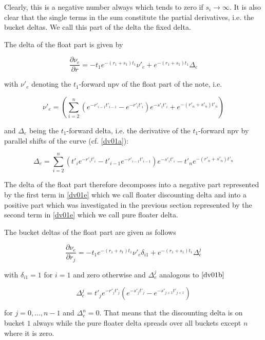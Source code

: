 \documentclass{amsart}
\theoremstyle{plain}
\numberwithin{equation}{section}
\begin{document}
Clearly, this is a negative number always which tends to zero if $s_i\rightarrow\infty$. It is also clear that the single terms in the sum constitute the
partial derivatives, i.e. the bucket deltas. We call this part of the delta the fixed delta.

The delta of the float part is given by

\begin{equation}\label{dv01e}
\frac{\partial \nu_e}{\partial r} = -t_1 e^{-(r_1+s_1)t_1} \nu'_e +  e^{-(r_1+s_1) t_1} \Delta_e
\end{equation}

with $\nu'_e$ denoting the $t_1$-forward npv of the float part of the note, i.e.

\begin{equation}
\nu'_e = \left( \sum_{i=2}^n (e^{-r'_{i-1} t'_{i-1}} - e^{-r'_i t'_i}) e^{-s'_i t'_i} + e^{-(r'_n+s'_n) t'_n} \right)
\end{equation}

and $\Delta_e$ being the $t_1$-forward delta, i.e. the derivative of the $t_1$-forward npv by parallel shifts of the curve (cf. \ref{dv01a}):

\begin{equation}
\Delta_e =  \sum_{i=2}^n ( t'_i e^{- r'_i t'_i} - t'_{i-1} e^{- r'_{i-1} t'_{i-1}}) e^{-s'_i t'_i} - t'_n e^{-(r'_n+s'_n) t'_n} 
\end{equation}

The delta of the float part therefore decomposes into a negative part represented by the first term in \ref{dv01e} which we call floater discounting delta
and into a positive part which was investigated in the previous section represented by the second term in \ref{dv01e} which we call pure floater delta.

The bucket deltas of the float part are given as follows

\begin{equation}\label{dv01g}
\frac{\partial \nu_e}{\partial r_j} = -t_1 e^{-(r_1+s_1)t_1} \nu'_e \delta_{i1} +  e^{-(r_1+s_1) t_1} \Delta_e^j
\end{equation}

with $\delta_{i1} = 1$ for $i=1$ and zero otherwise and $\Delta_e^j$ analogous to $\ref{dv01b}$ 

\begin{equation}\label{dv01h}
\Delta_e^j =  t'_je^{-r'_jt'_j} ( e^{-s'_jt'_j} - e^{-s'_{j+1} t'_{j+1}})
\end{equation}

for $j=0,...,n-1$ and $\Delta_e^n = 0$. That means that the discounting delta is on bucket $1$ always while the pure floater delta spreads over all buckets except $n$ where it is zero.
\end{document}
